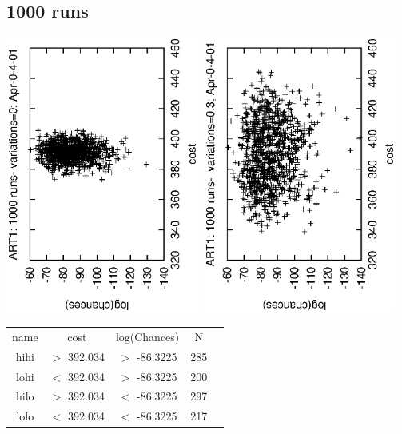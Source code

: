 \documentclass{article}
\begin{document}
\subsection{1000 runs}
\begin{center}
\includegraphics[angle=270,width=2.5in]{dat.eps}~\includegraphics[angle=270,width=2.5in]{proj.eps}
\end{center}

\begin{center}
{\footnotesize
\begin{tabular}{|c|c|c|c|c|}\hline
name&cost&log(Chances)&N\\
hihi& $>$ 392.034 &  $>$ -86.3225 & 285\\\hline
lohi& $<$ 392.034 &   $>$  -86.3225 & 200\\
hilo& $>$  392.034 &  $<$  -86.3225 & 297\\
lolo& $<$  392.034 & $<$   -86.3225 & 217\\\hline
\end{tabular}}
\end{center}
\end{document}
